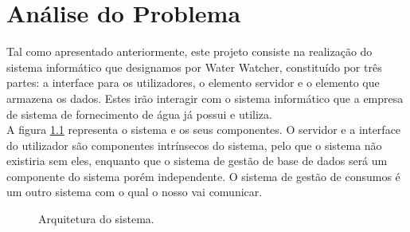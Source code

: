 \chapter{Análise do Problema} \label{cap:analise}

Tal como apresentado anteriormente, este projeto consiste na realização do sistema informático que designamos por Water Watcher, constituído por três partes: a interface para os utilizadores, o elemento servidor e o elemento que armazena os dados. Estes irão interagir com o sistema informático que a empresa de sistema de fornecimento de água já possui e utiliza.\\
A figura \ref{fig:modelo} representa o sistema e os seus componentes. O servidor e a interface do utilizador são componentes intrínsecos do sistema, pelo que o sistema não existiria sem eles, enquanto que o sistema de gestão de base de dados será um componente do sistema porém independente. O sistema de gestão de consumos é um outro sistema com o qual o nosso vai comunicar.

\vspace{1cm} %

\begin{figure}[ht!]
\centering
{}
\caption{Arquitetura do sistema.}
\label{fig:modelo}
\end{figure}

